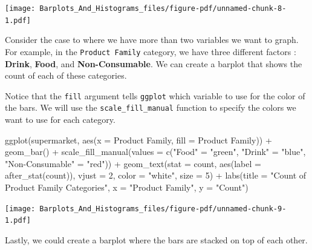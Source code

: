 \documentclass[
  letterpaper,
  DIV=11,
  numbers=noendperiod]{scrreprt}
\newenvironment{Shaded}{\begin{snugshade}}{\end{snugshade}}
\newcommand{\AttributeTok}[1]{\textcolor[rgb]{0.40,0.45,0.13}{#1}}
\newcommand{\DecValTok}[1]{\textcolor[rgb]{0.68,0.00,0.00}{#1}}
\newcommand{\FunctionTok}[1]{\textcolor[rgb]{0.28,0.35,0.67}{#1}}
\newcommand{\NormalTok}[1]{\textcolor[rgb]{0.00,0.23,0.31}{#1}}
\newcommand{\OtherTok}[1]{\textcolor[rgb]{0.00,0.23,0.31}{#1}}
\newcommand{\SpecialCharTok}[1]{\textcolor[rgb]{0.37,0.37,0.37}{#1}}
\newcommand{\StringTok}[1]{\textcolor[rgb]{0.13,0.47,0.30}{#1}}
\begin{document}
\texttt{[image: Barplots\_And\_Histograms\_files/figure-pdf/unnamed-chunk-8-1.pdf]}

Consider the case to where we have more than two variables we want to
graph. For example, in the \texttt{Product\ Family} category, we have
three different factors : \textbf{Drink}, \textbf{Food}, and
\textbf{Non-Consumable}. We can create a barplot that shows the count of
each of these categories.

Notice that the \texttt{fill} argument tells \texttt{ggplot} which
variable to use for the color of the bars. We will use the
\texttt{scale\_fill\_manual} function to specify the colors we want to
use for each category.

\begin{Shaded}
\begin{Highlighting}[]
\FunctionTok{ggplot}\NormalTok{(supermarket, }\FunctionTok{aes}\NormalTok{(}\AttributeTok{x =} \StringTok{\textasciigrave{}}\AttributeTok{Product Family}\StringTok{\textasciigrave{}}\NormalTok{, }\AttributeTok{fill =} \StringTok{\textasciigrave{}}\AttributeTok{Product Family}\StringTok{\textasciigrave{}}\NormalTok{)) }\SpecialCharTok{+}
  \FunctionTok{geom\_bar}\NormalTok{() }\SpecialCharTok{+}
  \FunctionTok{scale\_fill\_manual}\NormalTok{(}\AttributeTok{values =} \FunctionTok{c}\NormalTok{(}\StringTok{"Food"} \OtherTok{=} \StringTok{"green"}\NormalTok{, }\StringTok{"Drink"} \OtherTok{=} \StringTok{"blue"}\NormalTok{, }\StringTok{"Non{-}Consumable"} \OtherTok{=} \StringTok{"red"}\NormalTok{)) }\SpecialCharTok{+}
  \FunctionTok{geom\_text}\NormalTok{(}\AttributeTok{stat =} \StringTok{\textquotesingle{}count\textquotesingle{}}\NormalTok{, }\FunctionTok{aes}\NormalTok{(}\AttributeTok{label =} \FunctionTok{after\_stat}\NormalTok{(count)), }\AttributeTok{vjust =} \DecValTok{2}\NormalTok{, }\AttributeTok{color =} \StringTok{"white"}\NormalTok{, }\AttributeTok{size =} \DecValTok{5}\NormalTok{) }\SpecialCharTok{+}
  \FunctionTok{labs}\NormalTok{(}\AttributeTok{title =} \StringTok{"Count of Product Family Categories"}\NormalTok{,}
       \AttributeTok{x =} \StringTok{"Product Family"}\NormalTok{,}
       \AttributeTok{y =} \StringTok{"Count"}\NormalTok{)}
\end{Highlighting}
\end{Shaded}

\texttt{[image: Barplots\_And\_Histograms\_files/figure-pdf/unnamed-chunk-9-1.pdf]}

Lastly, we could create a barplot where the bars are stacked on top of
each other.
\end{document}
